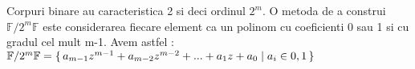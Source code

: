 \begin{dfn}
Corpuri binare au caracteristica 2 si deci ordinul $2^{m}$. O metoda de a construi $\mathbb{F}/2^{m}\mathbb{F}$ este considerarea fiecare element ca un polinom cu coeficienti 0 sau 1 si cu gradul cel mult m-1. Avem astfel : 
 $\mathbb{F}/2^{m}\mathbb{F} = \set {a_{m-1}z^{m-1} + a_{m-2}z^{m-2} + ... + a_{1}z + a_{0}\mid a_{i}\in {0,1}}$
\end{dfn}



